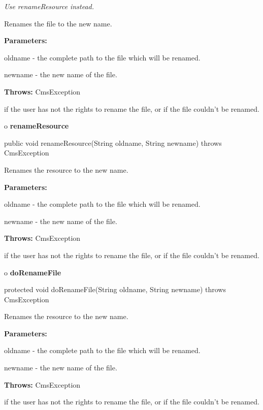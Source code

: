 \begin{description}
 {\it Use renameResource
instead.} 

Renames the file to the new name. 

\begin{description}
\item {\bf Parameters:}  

oldname - the complete path to the file which will be renamed.  

newname - the new name of the file.  
\item {\bf Throws:} CmsException  

if the user has not the rights to rename the file, or if the file couldn't be
renamed.  
\end{description}

\end{description}

o {\bf renameResource} 

\begin{PRE}
 public void renameResource(String oldname,
                            String newname) throws CmsException
\end{PRE}

\begin{description}
\htmlDD Renames the resource to the new name. 

\begin{description}
\item {\bf Parameters:}  

oldname - the complete path to the file which will be renamed.  

newname - the new name of the file.  
\item {\bf Throws:} CmsException  

if the user has not the rights to rename the file, or if the file couldn't be
renamed.  
\end{description}

\end{description}

o {\bf doRenameFile} 

\begin{PRE}
 protected void doRenameFile(String oldname,
                             String newname) throws CmsException
\end{PRE}

\begin{description}
\htmlDD Renames the resource to the new name. 

\begin{description}
\item {\bf Parameters:}  

oldname - the complete path to the file which will be renamed.  

newname - the new name of the file.  
\item {\bf Throws:} CmsException  

if the user has not the rights to rename the file, or if the file couldn't be
renamed.  
\end{description}

\end{description}

